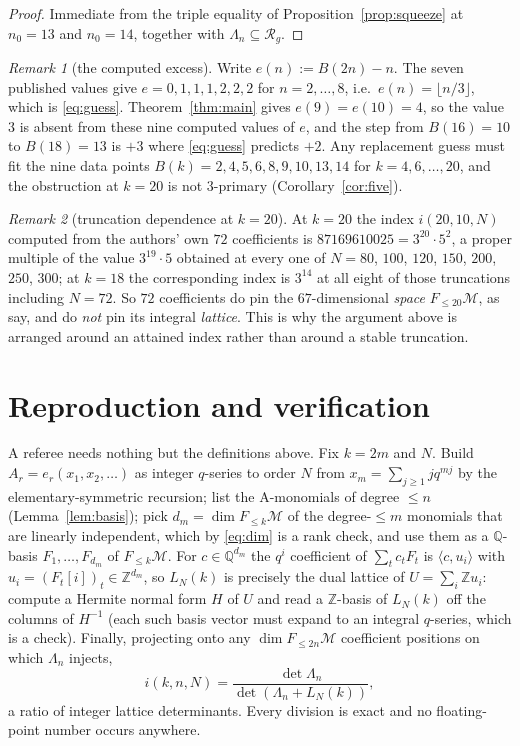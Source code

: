 \documentclass[11pt]{amsart}
\theoremstyle{remark}
\newtheorem*{remark}{Remark}
\newcommand{\Mm}{\mathcal M}
\newcommand{\Rg}{\mathcal R_g}
\newcommand{\Lam}{\Lambda}
\begin{document}
\begin{proof}
Immediate from the triple equality of Proposition~\ref{prop:squeeze} at $n_0=13$ and $n_0=14$,
together with $\Lam_n\subseteq\Rg$.
\end{proof}

\begin{remark}[the computed excess]
Write $e(n):=B(2n)-n$. The seven published values give
$e=0,1,1,1,2,2,2$ for $n=2,\dots,8$, i.e.\ $e(n)=\lfloor n/3\rfloor$, which is
\eqref{eq:guess}. Theorem~\ref{thm:main} gives $e(9)=e(10)=4$, so the value $3$ is absent from
these nine computed values of $e$, and the step from $B(16)=10$ to $B(18)=13$ is $+3$ where
\eqref{eq:guess} predicts $+2$. Any replacement guess must fit the nine data points
$B(k)=2,4,5,6,8,9,10,13,14$ for $k=4,6,\dots,20$, and the obstruction at $k=20$ is not $3$-primary
(Corollary~\ref{cor:five}).
\end{remark}

\begin{remark}[truncation dependence at $k=20$]
At $k=20$ the index $i(20,10,N)$ computed from the authors' own $72$ coefficients is
$87169610025=3^{20}\cdot5^{2}$, a proper multiple of the value $3^{19}\cdot5$ obtained at every
one of $N=80$, $100$, $120$, $150$, $200$, $250$, $300$; at $k=18$ the corresponding index is
$3^{14}$ at all eight of
those truncations including $N=72$. So $72$ coefficients do pin the $67$-dimensional \emph{space}
$F_{\le20}\Mm$, as \cite{BY} say, and do \emph{not} pin its integral \emph{lattice}. This is why
the argument above is arranged around an attained index rather than around a stable truncation.
\end{remark}

\section{Reproduction and verification}

A referee needs nothing but the definitions above. Fix $k=2m$ and $N$. Build
$A_r=e_r(x_1,x_2,\dots)$ as integer $q$-series to order $N$ from
$x_m=\sum_{j\ge1}jq^{mj}$ by the elementary-symmetric recursion; list the A-monomials of degree
$\le n$ (Lemma~\ref{lem:basis}); pick $d_m=\dim F_{\le k}\Mm$ of the degree-$\le m$ monomials that
are linearly independent, which by \eqref{eq:dim} is a rank check, and use them as a
$\mathbb Q$-basis $F_1,\dots,F_{d_m}$ of $F_{\le k}\Mm$. For $c\in\mathbb Q^{d_m}$ the $q^i$
coefficient of $\sum_tc_tF_t$ is $\langle c,u_i\rangle$ with $u_i=(F_t[i])_t\in\mathbb Z^{d_m}$, so
$L_N(k)$ is precisely the dual lattice of $U=\sum_i\mathbb Z u_i$: compute a Hermite normal form
$H$ of $U$ and read a $\mathbb Z$-basis of $L_N(k)$ off the columns of $H^{-1}$ (each such basis
vector must expand to an integral $q$-series, which is a check). Finally, projecting onto any
$\dim F_{\le2n}\Mm$ coefficient positions on which $\Lam_n$ injects,
\[
 i(k,n,N)=\frac{\det\Lam_n}{\det(\Lam_n+L_N(k))},
\]
a ratio of integer lattice determinants. Every division is exact and no floating-point number
occurs anywhere.
\end{document}
